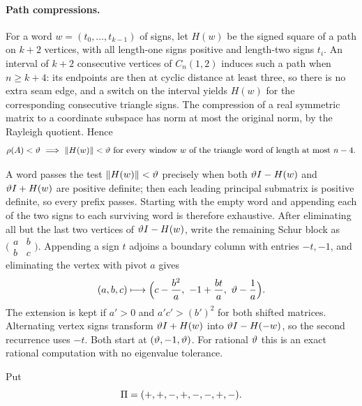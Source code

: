 \paragraph{Path compressions.}
For a word $w=(t_0,\dots,t_{k-1})$ of signs, let $H(w)$ be the signed
square of a path on $k+2$ vertices, with all length-one signs positive and
length-two signs $t_i$. An interval of $k+2$ consecutive vertices of
$C_n(1,2)$ induces such a path when $n\ge k+4$: its endpoints are then at
cyclic distance at least three, so there is no extra seam edge, and a
switch on the interval yields $H(w)$ for the corresponding consecutive
triangle signs. The compression of a real symmetric matrix to a coordinate
subspace has norm at most the original norm, by the Rayleigh quotient.
Hence
\begin{equation}\label{gra:eq:compress}
 \rho(A)<\vartheta\ \Longrightarrow\ \lVert H(w)\rVert<\vartheta
 \ \text{for every window $w$ of the triangle word of length at most $n-4$.}
\end{equation}

A word passes the test $\lVert H(w)\rVert<\vartheta$ precisely when both
$\vartheta I-H(w)$ and $\vartheta I+H(w)$ are positive definite; then each
leading principal submatrix is positive definite, so every prefix passes.
Starting with the empty word and appending each of the two signs to each
surviving word is therefore exhaustive. After eliminating all but the last
two vertices of $\vartheta I-H(w)$, write the remaining Schur block as
$\bigl(\begin{smallmatrix}a&b\\b&c\end{smallmatrix}\bigr)$. Appending a
sign $t$ adjoins a boundary column with entries $-t,-1$, and eliminating
the vertex with pivot $a$ gives
\begin{equation}\label{gra:eq:schur}
 (a,b,c)\longmapsto\Bigl(c-\frac{b^2}{a},\ -1+\frac{bt}{a},\
 \vartheta-\frac1a\Bigr).
\end{equation}
The extension is kept if $a'>0$ and $a'c'>(b')^2$ for both shifted
matrices. Alternating vertex signs transform $\vartheta I+H(w)$ into
$\vartheta I-H(-w)$, so the second recurrence uses $-t$. Both start at
$(\vartheta,-1,\vartheta)$. For rational $\vartheta$ this is an exact rational
computation with no eigenvalue tolerance.

Put
\[
 \Pi=(+,+,-,+,-,-,+,-).
\]

